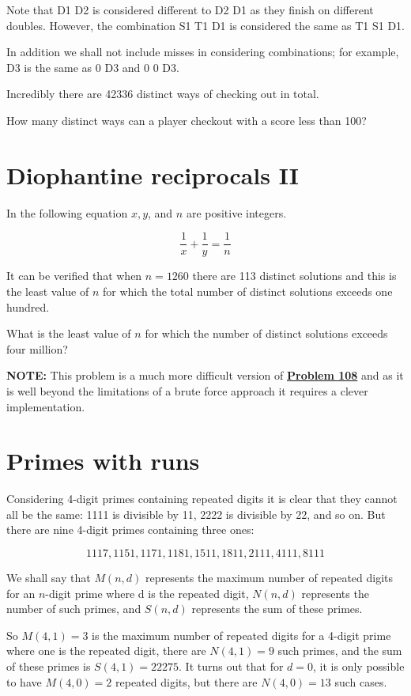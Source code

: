 Note that D1 D2 is considered different to D2 D1 as they finish on different doubles. However, the combination S1 T1 D1 is considered the same as T1 S1 D1.

In addition we shall not include misses in considering combinations; for example, D3 is the same as 0 D3 and 0 0 D3.

Incredibly there are 42336 distinct ways of checking out in total.

How many distinct ways can a player checkout with a score less than 100?


\section{Diophantine reciprocals II} \label{pb.0110}

In the following equation $x, y$, and $n$ are positive integers.

$$\frac{1}{x} + \frac{1}{y} = \frac{1}{n}$$

It can be verified that when $n = 1260$ there are 113 distinct solutions and this is the least value of $n$ for which the total number of distinct solutions exceeds one hundred.

What is the least value of $n$ for which the number of distinct solutions exceeds four million?
\medskip

\textbf{NOTE:} This problem is a much more difficult version of \hyperref[pb.0108]{\textbf{Problem 108}} and as it is well beyond the limitations of a brute force approach it requires a clever implementation.

\newpage


\section{Primes with runs} \label{pb.0111}

Considering 4-digit primes containing repeated digits it is clear that they cannot all be the same: 1111 is divisible by 11, 2222 is divisible by 22, and so on. But there are nine 4-digit primes containing three ones:

$$1117, 1151, 1171, 1181, 1511, 1811, 2111, 4111, 8111$$

We shall say that $M(n, d)$ represents the maximum number of repeated digits for an $n$-digit prime where d is the repeated digit, $N(n, d)$ represents the number of such primes, and $S(n, d)$ represents the sum of these primes.

So $M(4, 1) = 3$ is the maximum number of repeated digits for a 4-digit prime where one is the repeated digit, there are $N(4, 1) = 9$ such primes, and the sum of these primes is $S(4, 1) = 22275$. It turns out that for $d = 0$, it is only possible to have $M(4, 0) = 2$ repeated digits, but there are $N(4, 0) = 13$ such cases.

